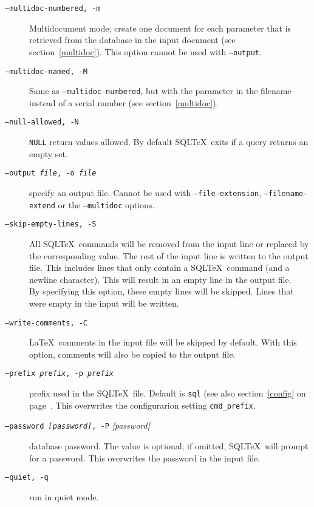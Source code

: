 \documentclass{article}
\begin{document}
\begin{description}
\item[\texttt{--multidoc-numbered, -m}] Multidocument mode; create one document for each parameter that is retrieved
from the database in the input document (see section~\ref{multidoc}). This option cannot be used with \texttt{--output}.

\item[\texttt{--multidoc-named, -M}] Same as \texttt{--multidoc-numbered}, but with the parameter in the filename instead of a serial number (see section~\ref{multidoc}).

\item[\texttt{--null-allowed, -N}] \texttt{NULL} return values allowed. By default SQL\TeX\ exits if a
query returns an empty set.

\item[\texttt{--output \textit{file}, -o \textit{file}}] specify an output file. Cannot be used with \texttt{--file-extension},
\texttt{--filename-extend} or the  \texttt{--multidoc} options.

\item[\texttt{--skip-empty-lines, -S}] All SQL\TeX\ commands will be removed from the input line or replaced by the corresponding value. The rest of the input line is written to the output file.
This includes lines that only contain a SQL\TeX\ command (and a newline character). This will result in an empty line in the output file.\\
By specifying this option, these empty lines will be skipped. Lines that were empty in the input will be written.

\item[\texttt{--write-comments, -C}]  \LaTeX\ comments in the input file will be skipped by default. With this option, comments will also be copied to the output file.
 
\item[\texttt{--prefix \textit{prefix}, -p \textit{prefix}}] prefix used in the SQL\TeX\ file. Default is \texttt{sql} (see also section~\ref{config}
on page~\pageref{prefix}. This overwrites the configurarion setting \texttt{cmd\_prefix}.

\item[\texttt{--password \textit{[password]}, -P} \textit{[password]}] database password. The value is optional; if omitted, SQL\TeX\ will prompt for a password. This overwrites the password in the input file.

\item[\texttt{--quiet, -q}] run in quiet mode.


\end{description}
\end{document}
